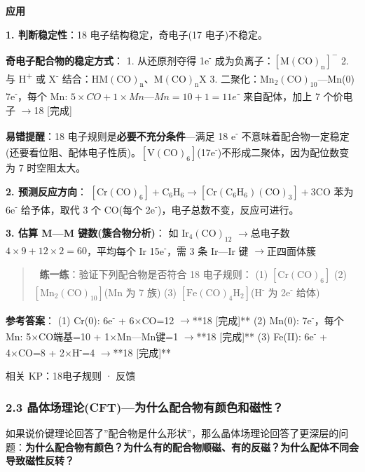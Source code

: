 \documentclass[a4paper,11pt]{ctexart}
\newcommand{\箭}{\ensuremath{\rightarrow}}
\newcommand{\左箭}{\ensuremath{\leftarrow}}
\newcommand{\上箭}{\ensuremath{\uparrow}}
\newcommand{\下箭}{\ensuremath{\downarrow}}
\newcommand{\衡}{\ensuremath{\rightleftharpoons}}
\newcommand{\双箭}{\ensuremath{\leftrightarrow}}
\newcommand{\约等于}{\ensuremath{\approx}}
\newcommand{\小于等于}{\ensuremath{\leq}}
\newcommand{\大于等于}{\ensuremath{\geq}}
\newcommand{\不等于}{\ensuremath{\neq}}
\newcommand{\西格马}{\ensuremath{\sigma}}
\newcommand{\派}{\ensuremath{\pi}}
\begin{document}
\textbf{应用}

\textbf{1. 判断稳定性}：18 电子结构稳定，奇电子(17 电子)不稳定。

\textbf{奇电子配合物的稳定方式}：
1. 从还原剂夺得 1e\textsuperscript{-} 成为负离子：\([\mathrm{M(CO)_n}]^-\)
2. 与 H\textsuperscript{+} 或 X\textsuperscript{-} 结合：\(\mathrm{HM(CO)_n}\)、\(\mathrm{M(CO)_nX}\)
3. 二聚化：\(\mathrm{Mn_2(CO)_{10}}\)---Mn(0) 7e\textsuperscript{-}，每个 Mn: \(5 \times CO + 1 \times Mn—Mn = 10 + 1 = 11e⁻\) 来自配体，加上 7 个价电子 \箭 18 {[}完成{]}

\textbf{易错提醒}：18 电子规则是\textbf{必要不充分条件}---满足 18 e\textsuperscript{-} 不意味着配合物一定稳定(还要看位阻、配体电子性质)。\([\mathrm{V(CO)_6}]\)(17e\textsuperscript{-})不形成二聚体，因为配位数变为 7 时空阻太大。

\textbf{2. 预测反应方向}：
\([\mathrm{Cr(CO)_6}] + \mathrm{C_6H_6} \rightarrow [\mathrm{Cr(C_6H_6)(CO)_3}] + 3\mathrm{CO}\)
苯为 6e\textsuperscript{-} 给予体，取代 3 个 CO(每个 2e\textsuperscript{-})，电子总数不变，反应可进行。

\textbf{3. 估算 M---M 键数(簇合物分析)}：
如 \(\mathrm{Ir_4(CO)_{12}}\) \箭 总电子数 \(4 \times 9 + 12 \times 2 = 60\)，平均每个 Ir 15e\textsuperscript{-}，需 3 条 Ir---Ir 键 \箭 正四面体簇

\begin{quote}
📝 \textbf{练一练}：验证下列配合物是否符合 18 电子规则：
(1) \(\mathrm{[Cr(CO)_6]}\)
(2) \(\mathrm{[Mn_2(CO)_{10}]}\)(Mn 为 7 族)
(3) \(\mathrm{[Fe(CO)_4H_2]}\)(H\textsuperscript{-} 为 2e\textsuperscript{-} 给体)
\end{quote}

\textbf{参考答案}：
(1) Cr(0): 6e\textsuperscript{-} + 6×CO=12 \箭 **18 {[}完成{]}**
(2) Mn(0): 7e\textsuperscript{-}，每个 Mn: 5×CO端基=10 + 1×Mn---Mn键=1 \箭 **18 {[}完成{]}**
(3) Fe(II): 6e\textsuperscript{-} + 4×CO=8 + 2×H\textsuperscript{-}=4 \箭 **18 {[}完成{]}**

相关 KP：18电子规则 · 反馈

\subsubsection{2.3 晶体场理论(CFT)---为什么配合物有颜色和磁性？}\label{ux6676ux4f53ux573aux7406ux8bbacftux4e3aux4ec0ux4e48ux914dux5408ux7269ux6709ux989cux8272ux548cux78c1ux6027}

如果说价键理论回答了''配合物是什么形状''，那么晶体场理论回答了更深层的问题：\textbf{为什么配合物有颜色？为什么有的配合物顺磁、有的反磁？为什么配体不同会导致磁性反转？}
\end{document}
